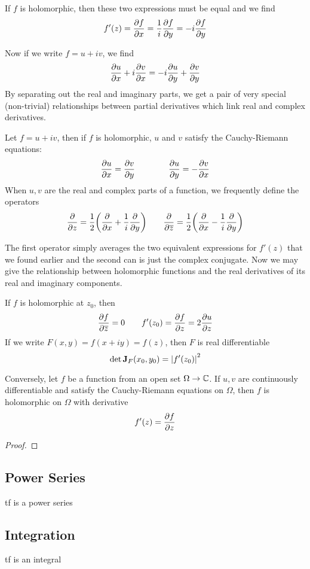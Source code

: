 If $f$ is holomorphic, then these two expressions must be equal and we find
\[ f'(z) = \pdv{f}{x} = \frac{1}{i} \pdv{f}{y} = -i \pdv{f}{y} \]

Now if we write $f = u + iv$, we find
\[ \pdv{u}{x} + i \pdv{v}{x} = -i \pdv{u}{y} + \pdv{v}{y} \]
By separating out the real and imaginary parts, we get a pair of very special (non-trivial) relationships between partial derivatives which link real and complex derivatives.

\newpage 
\begin{definition}
	Let $f = u + iv$, then if $f$ is holomorphic, $u$ and $v$ satisfy the Cauchy-Riemann equations:
	\[ \pdv{u}{x} = \pdv{v}{y} \qquad \qquad \pdv{u}{y} = -\pdv{v}{x} \]
	When $u,v$ are the real and complex parts of a function, we frequently define the operators
	\[ \pdv{z} = \frac{1}{2} \qty( \pdv{x} + \frac{1}{i} \pdv{y}) \qquad \pdv{\overline{z}} = \frac{1}{2} \qty( \pdv{x} - \frac{1}{i} \pdv{y}) \]
\end{definition}

The first operator simply averages the two equivalent expressions for $f'(z)$ that we found earlier and the second can is just the complex conjugate. Now we may give the relationship between holomorphic functions and the real derivatives of its real and imaginary components.

\begin{theorem}
	If $f$ is holomorphic at $z_0$, then
	\[ \pdv{f}{\overline{z}}(z_0) = 0 \qquad f'(z_0) = \pdv{f}{z}(z_0) = 2\pdv{u}{z}(z_0) \]
	If we write $F(x, y) = f(x + iy) = f(z)$, then $F$ is real differentiable
	\[ \det \mathbf J_F(x_0, y_0) = \abs{f'(z_0)}^2\]
	
	Conversely, let $f$ be a function from an open set $\Omega \to \mathbb{C}$. If $u, v$ are continuously differentiable and satisfy the Cauchy-Riemann equations on $\Omega$, then $f$ is holomorphic on $\Omega$ with derivative
	\[ f'(z) = \pdv{f}{z} \]
\end{theorem}
\begin{proof}
\end{proof}

\newpage 
\subsection{Power Series}
tf is a power series

\newpage 
\subsection{Integration}
tf is an integral

